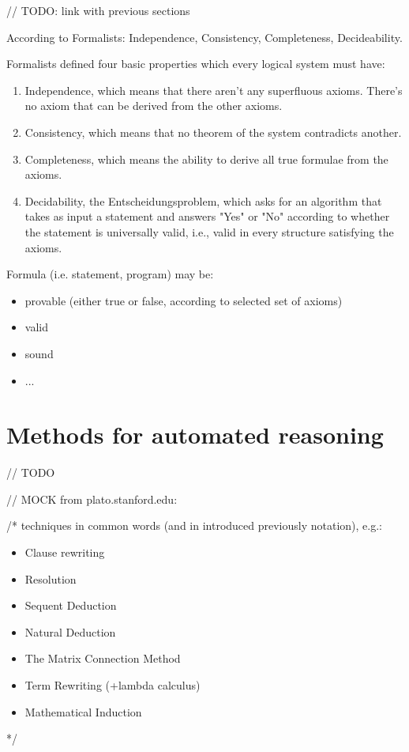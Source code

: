 \documentclass[article]{aaltoseries}
\begin{document}
// TODO: link with previous sections

According to Formalists: Independence, Consistency, Completeness, Decideability.

Formalists defined four basic properties which every logical system must have:
\begin{enumerate}
\itemsep0em
\item Independence, which means that there aren’t any superfluous axioms. There’s no axiom that can be derived from the other axioms.
\item Consistency, which means that no theorem of the system contradicts another.
\item Completeness, which means the ability to derive all true formulae from the axioms.
\item Decidability, the Entscheidungsproblem, which asks for an algorithm that takes as input a statement and answers "Yes" or "No" according to whether the statement is universally valid, i.e., valid in every structure satisfying the axioms.
\end{enumerate}

Formula (i.e. statement, program) may be:
\begin{itemize}
\itemsep0em
	\item provable (either true or false, according to selected set of axioms)
	\item valid
	\item sound
	\item ...
\end{itemize}


\section{Methods for automated reasoning}
\label{sec:auto_reasoning}

// TODO

// MOCK from plato.stanford.edu:  %

/* techniques in common words (and in introduced previously notation), e.g.: 
\begin{itemize}
\itemsep0em
	\item Clause rewriting
	\item Resolution
	\item Sequent Deduction
	\item Natural Deduction
	\item The Matrix Connection Method
	\item Term Rewriting (+lambda calculus)
	\item Mathematical Induction
\end{itemize}
*/
\end{document}
